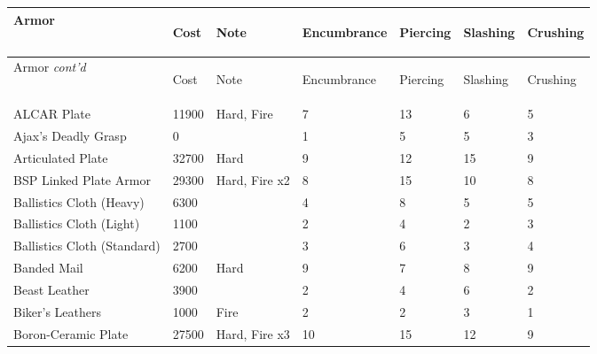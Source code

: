 \documentclass[twoside]{book}
\begin{document}
\begin{longtable}{p{1.25in}llp{2em}p{2em}p{2em}p{2em}} 
  Armor& \begin{turn}{70}{Cost}\end{turn}
          & \begin{turn}{70}{Note}\end{turn}
          & \begin{turn}{70}{Encumbrance}\end{turn}
          & \begin{turn}{70}{Piercing}\end{turn}
          & \begin{turn}{70}{Slashing}\end{turn}
          & \begin{turn}{70}{Crushing}\end{turn}
          \\
  \hline
  \hline
  \endfirsthead
  Armor \textit{cont'd}
        & \begin{turn}{70}{Cost}\end{turn}
          & \begin{turn}{70}{Note}\end{turn}
          & \begin{turn}{70}{Encumbrance}\end{turn}
          & \begin{turn}{70}{Piercing}\end{turn}
          & \begin{turn}{70}{Slashing}\end{turn}
          & \begin{turn}{70}{Crushing}\end{turn}
           \\
  \hline
  \endhead
\raggedright  ALCAR Plate& 11900& Hard, Fire& 7& 13& 6& 5\tabularnewline
      \raggedright  Ajax's Deadly Grasp& 0&& 1& 5& 5& 3\tabularnewline
      \raggedright  Articulated Plate& 32700& Hard& 9& 12& 15& 9\tabularnewline
      \raggedright  BSP Linked Plate Armor& 29300& Hard, Fire x2& 8& 15& 10& 8\tabularnewline
      \raggedright  Ballistics Cloth (Heavy)& 6300&& 4& 8& 5& 5\tabularnewline
      \raggedright  Ballistics Cloth (Light)& 1100&& 2& 4& 2& 3\tabularnewline
      \raggedright  Ballistics Cloth (Standard)& 2700&& 3& 6& 3& 4\tabularnewline
      \raggedright  Banded Mail& 6200& Hard& 9& 7& 8& 9\tabularnewline
      \raggedright  Beast Leather& 3900&& 2& 4& 6& 2\tabularnewline
      \raggedright  Biker's Leathers& 1000& Fire& 2& 2& 3& 1\tabularnewline
      \raggedright  Boron-Ceramic Plate& 27500& Hard, Fire x3& 10& 15& 12& 9\tabularnewline

\end{longtable}
\end{document}
